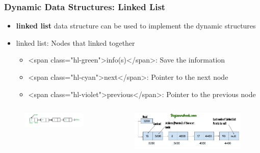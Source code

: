 \documentclass{../c-lecture}
\begin{document}
\begin{frame}
  \frametitle{Dynamic Data Structures: Linked List}
  \begin{itemize}
    \item
      \textbf{\color{Orange} linked list} data structure can be used to
      implement the dynamic structures

    \item linked list: Nodes that linked together
    \begin{itemize}
      \item <span class="hl-green">info(s)</span>: Save the information
      \item <span class="hl-cyan">next</span>: Pointer to the next node
      \item
        <span class="hl-violet">previous</span>: Pointer to the previous node

    \end{itemize}
  \end{itemize}
\end{frame}

\begin{frame}
  \begin{columns}
    \begin{column}{.5\textwidth}
      \begin{figure}
        \includegraphics[width=\textwidth]{./img/ll-1.png}
      \end{figure}
    \end{column}
    \begin{column}{.5\textwidth}
      \begin{figure}
        \includegraphics[width=\textwidth]{./img/ll-2.png}
      \end{figure}
    \end{column}
  \end{columns}
\end{frame}
\end{document}
